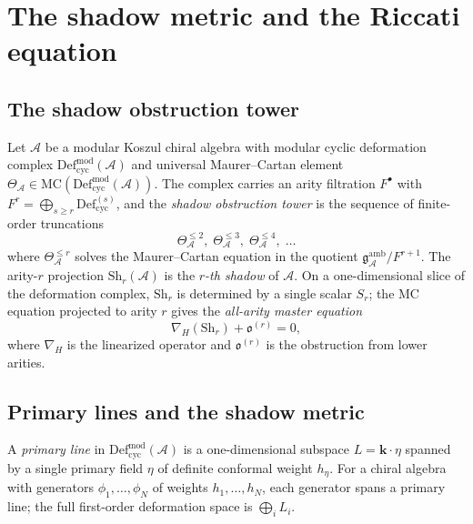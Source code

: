 

\section{The shadow metric and the Riccati equation}
\label{sec:shadow-metric}

\subsection{The shadow obstruction tower}

Let $\mathcal{A}$ be a modular Koszul chiral algebra with modular
cyclic deformation complex $\mathrm{Def}_{\mathrm{cyc}}^{\mathrm{mod}}(\mathcal{A})$
and universal Maurer--Cartan element
$\Theta_{\mathcal{A}} \in \mathrm{MC}(\mathrm{Def}_{\mathrm{cyc}}^{\mathrm{mod}}(\mathcal{A}))$.
The complex carries an arity filtration $F^{\bullet}$ with
$F^r = \bigoplus_{s \geq r} \mathrm{Def}_{\mathrm{cyc}}^{(s)}$,
and the \emph{shadow obstruction tower} is the sequence of
finite-order truncations
\[
 \Theta_{\mathcal{A}}^{\leq 2},\;
 \Theta_{\mathcal{A}}^{\leq 3},\;
 \Theta_{\mathcal{A}}^{\leq 4},\;
 \ldots
\]
where $\Theta_{\mathcal{A}}^{\leq r}$ solves the Maurer--Cartan equation
in the quotient $\mathfrak{g}_{\mathcal{A}}^{\mathrm{amb}} / F^{r+1}$.
The arity-$r$ projection $\mathrm{Sh}_r(\mathcal{A})$ is the
\emph{$r$-th shadow} of $\mathcal{A}$. On a one-dimensional
slice of the deformation complex, $\mathrm{Sh}_r$ is determined
by a single scalar $S_r$; the MC equation projected to arity $r$
gives the \emph{all-arity master equation}
\begin{equation}
\label{eq:master-equation}
 \nabla_H(\mathrm{Sh}_r) + \mathfrak{o}^{(r)} = 0,
\end{equation}
where $\nabla_H$ is the linearized operator and $\mathfrak{o}^{(r)}$
is the obstruction from lower arities.

\subsection{Primary lines and the shadow metric}

\begin{definition}
\label{def:primary-line}
A \emph{primary line} in $\mathrm{Def}_{\mathrm{cyc}}^{\mathrm{mod}}(\mathcal{A})$
is a one-dimensional subspace $L = \mathbf{k} \cdot \eta$
spanned by a single primary field $\eta$ of definite conformal
weight $h_\eta$. For a chiral algebra with generators
$\phi_1, \ldots, \phi_N$ of weights $h_1, \ldots, h_N$,
each generator spans a primary line; the full first-order
deformation space is $\bigoplus_i L_i$.
\end{definition}

